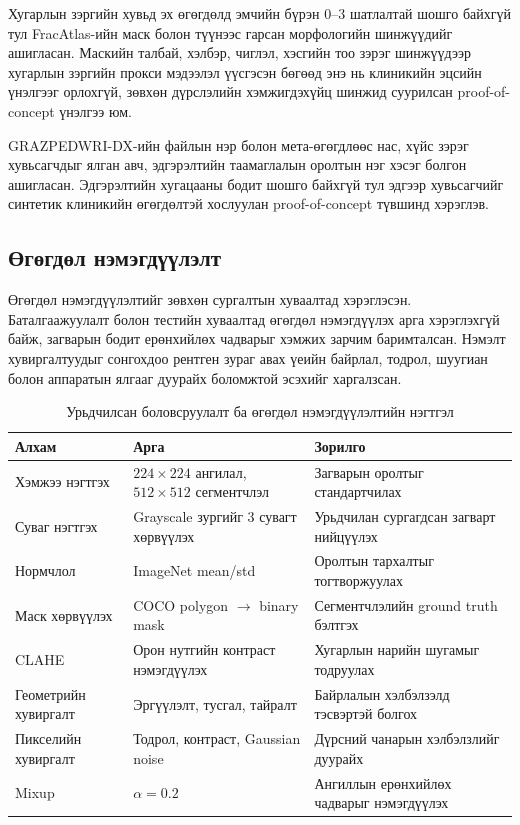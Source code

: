 Хугарлын зэргийн хувьд эх өгөгдөлд эмчийн бүрэн 0--3 шатлалтай шошго байхгүй тул FracAtlas-ийн маск болон түүнээс гарсан морфологийн шинжүүдийг ашигласан. Маскийн талбай, хэлбэр, чиглэл, хэсгийн тоо зэрэг шинжүүдээр хугарлын зэргийн прокси мэдээлэл үүсгэсэн бөгөөд энэ нь клиникийн эцсийн үнэлгээг орлохгүй, зөвхөн дүрслэлийн хэмжигдэхүйц шинжид суурилсан proof-of-concept үнэлгээ юм.

GRAZPEDWRI-DX-ийн файлын нэр болон мета-өгөгдлөөс нас, хүйс зэрэг хувьсагчдыг ялган авч, эдгэрэлтийн таамаглалын оролтын нэг хэсэг болгон ашигласан. Эдгэрэлтийн хугацааны бодит шошго байхгүй тул эдгээр хувьсагчийг синтетик клиникийн өгөгдөлтэй хослуулан proof-of-concept түвшинд хэрэглэв.

\subsection*{Өгөгдөл нэмэгдүүлэлт}

Өгөгдөл нэмэгдүүлэлтийг зөвхөн сургалтын хуваалтад хэрэглэсэн. Баталгаажуулалт болон тестийн хуваалтад өгөгдөл нэмэгдүүлэх арга хэрэглэхгүй байж, загварын бодит ерөнхийлөх чадварыг хэмжих зарчим баримталсан. Нэмэлт хувиргалтуудыг сонгохдоо рентген зураг авах үеийн байрлал, тодрол, шуугиан болон аппаратын ялгааг дуурайх боломжтой эсэхийг харгалзсан.

\begin{table}[H]
    \centering
    \caption{Урьдчилсан боловсруулалт ба өгөгдөл нэмэгдүүлэлтийн нэгтгэл}
    \label{tab:preprocess_augmentation}
    \small
    \begin{tabular}{p{3.6cm} p{4.4cm} p{4.4cm}}
    \toprule
    \textbf{Алхам} & \textbf{Арга} & \textbf{Зорилго} \\
    \midrule
    Хэмжээ нэгтгэх & $224\times224$ ангилал, $512\times512$ сегментчлэл & Загварын оролтыг стандартчилах \\
    Суваг нэгтгэх & Grayscale зургийг 3 сувагт хөрвүүлэх & Урьдчилан сургагдсан загварт нийцүүлэх \\
    Нормчлол & ImageNet mean/std & Оролтын тархалтыг тогтворжуулах \\
    Маск хөрвүүлэх & COCO polygon $\rightarrow$ binary mask & Сегментчлэлийн ground truth бэлтгэх \\
    CLAHE & Орон нутгийн контраст нэмэгдүүлэх & Хугарлын нарийн шугамыг тодруулах \\
    Геометрийн хувиргалт & Эргүүлэлт, тусгал, тайралт & Байрлалын хэлбэлзэлд тэсвэртэй болгох \\
    Пикселийн хувиргалт & Тодрол, контраст, Gaussian noise & Дүрсний чанарын хэлбэлзлийг дуурайх \\
    Mixup~\cite{zhang2018mixup} & $\alpha=0.2$ & Ангиллын ерөнхийлөх чадварыг нэмэгдүүлэх \\
    \bottomrule
    \end{tabular}
\end{table}


